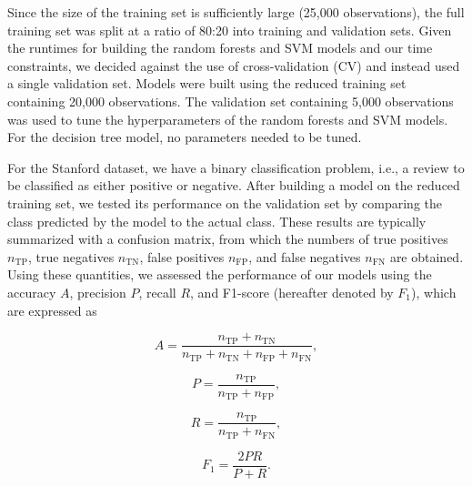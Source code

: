 \documentclass[conference]{IEEEtran}
\begin{document}
Since the size of the training set is sufficiently large (25,000 observations), the full training set was split at a ratio of 80:20 into training and validation sets. Given the runtimes for building the random forests and SVM models and our time constraints, we decided against the use of cross-validation (CV) and instead used a single validation set. Models were built using the reduced training set containing 20,000 observations. The validation set containing 5,000 observations was used to tune the hyperparameters of the random forests and SVM models. For the decision tree model, no parameters needed to be tuned.

For the Stanford dataset, we have a binary classification problem, i.e., a review to be classified as either positive or negative. After building a model on the reduced training set, we tested its performance on the validation set by comparing the class predicted by the model to the actual class. These results are typically summarized with a confusion matrix, from which the numbers of true positives \(n_\mathrm{TP}\), true negatives \(n_\mathrm{TN}\), false positives \(n_\mathrm{FP}\), and false negatives \(n_\mathrm{FN}\) are obtained. Using these quantities, we assessed the performance of our models using the accuracy \(A\), precision \(P\), recall \(R\), and F1-score (hereafter denoted by \(F_1\)), which are expressed as


\begin{equation}
    A=\frac{n_\mathrm{TP} + n_\mathrm{TN}}{n_\mathrm{TP} + n_\mathrm{TN} + n_\mathrm{FP} + n_\mathrm{FN}},
    \label{eq:Acc}
\end{equation}

\begin{equation}
    P=\frac{n_\mathrm{TP}}{n_\mathrm{TP} + n_\mathrm{FP}},
    \label{eq:Pre}
\end{equation}

\begin{equation}
    R=\frac{n_\mathrm{TP}}{n_\mathrm{TP} + n_\mathrm{FN}},
    \label{eq:Rec}
\end{equation}

\begin{equation}
    F_1=\frac{2PR}{P + R}.
    \label{eq:F1}
\end{equation}
\end{document}
